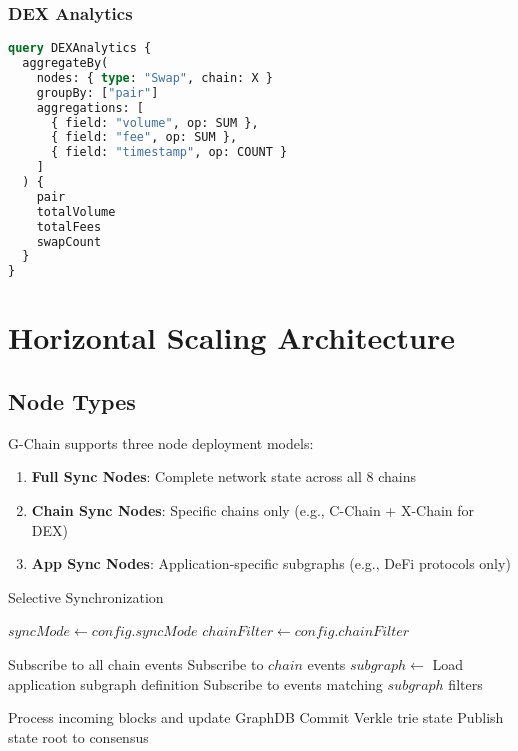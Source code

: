 \documentclass[11pt,a4paper]{article}
\begin{document}
\subsubsection{DEX Analytics}

\begin{lstlisting}[language=GraphQL, basicstyle=\small\ttfamily]
query DEXAnalytics {
  aggregateBy(
    nodes: { type: "Swap", chain: X }
    groupBy: ["pair"]
    aggregations: [
      { field: "volume", op: SUM },
      { field: "fee", op: SUM },
      { field: "timestamp", op: COUNT }
    ]
  ) {
    pair
    totalVolume
    totalFees
    swapCount
  }
}
\end{lstlisting}

\section{Horizontal Scaling Architecture}

\subsection{Node Types}

G-Chain supports three node deployment models:

\begin{enumerate}
\item \textbf{Full Sync Nodes}: Complete network state across all 8 chains
\item \textbf{Chain Sync Nodes}: Specific chains only (e.g., C-Chain + X-Chain for DEX)
\item \textbf{App Sync Nodes}: Application-specific subgraphs (e.g., DeFi protocols only)
\end{enumerate}

\begin{algorithm}[H]
\caption{Selective Synchronization}
\begin{algorithmic}[1]
    \State $syncMode \gets config.syncMode$
    \State $chainFilter \gets config.chainFilter$
    
        \State Subscribe to all chain events
            \State Subscribe to $chain$ events
        \EndFor
        \State $subgraph \gets$ Load application subgraph definition
        \State Subscribe to events matching $subgraph$ filters
    \EndIf
    
    \State Process incoming blocks and update GraphDB
    \State Commit Verkle trie state
    \State Publish state root to consensus
\EndFunction
\end{algorithmic}
\end{algorithm}
\end{document}
